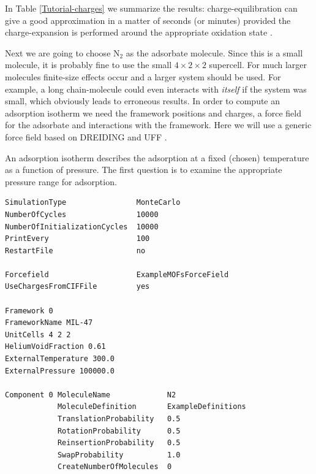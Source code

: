 In Table \ref{Tutorial-charges} we summarize the results: charge-equilibration can give a good approximation in a matter of seconds (or minutes)
provided the charge-expansion is performed around the appropriate oxidation state \cite{Wilmer2012}.


Next we are going to choose N$_2$ as the adsorbate molecule. Since this is a small molecule, it is probably fine to use the small $4\times2\times2$ supercell.
For much larger molecules finite-size effects occur and a larger system should be used. For example, a long chain-molecule could even interacts with 
\emph{itself} if the system was small, which obviously leads to erroneous results.
In order to compute an adsorption isotherm we need the framework positions and charges, a force field for the adsorbate and interactions with the framework.
Here we will use a generic force field based on DREIDING and UFF \cite{MayoOlafsonGoddard1990,RappeCasewitColwellGoddardSkiff1992}.

An adsorption isotherm describes the adsorption at a fixed (chosen) temperature as a function of pressure. The first question is to examine the appropriate
pressure range for adsorption.

\begin{center}
\end{center}

\begin{center}
\end{center}

\begin{verbatim}
SimulationType                MonteCarlo
NumberOfCycles                10000
NumberOfInitializationCycles  10000
PrintEvery                    100
RestartFile                   no

Forcefield                    ExampleMOFsForceField
UseChargesFromCIFFile         yes

Framework 0
FrameworkName MIL-47
UnitCells 4 2 2
HeliumVoidFraction 0.61
ExternalTemperature 300.0
ExternalPressure 100000.0

Component 0 MoleculeName             N2
            MoleculeDefinition       ExampleDefinitions
            TranslationProbability   0.5
            RotationProbability      0.5
            ReinsertionProbability   0.5
            SwapProbability          1.0
            CreateNumberOfMolecules  0
\end{verbatim}

